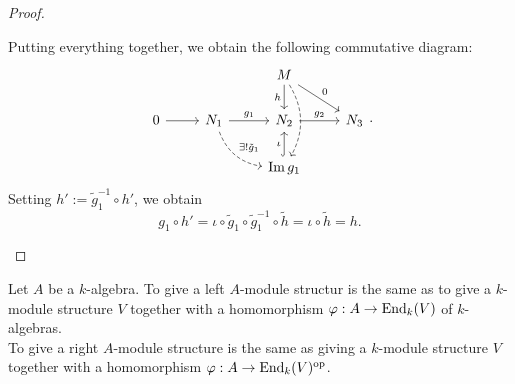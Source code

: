 \begin{proof}
\begin{itemize}
      Putting everything together, we obtain the following commutative diagram:
      \[
      \begin{tikzcd}
        &&M\ar[swap]{d}{h}\ar{rd}{0}\ar[bend left,dashed]{dd}&\\
        0\ar{r}&N_1\ar{r}{g_1}\ar[bend right,dashed]{dr}{\exists !\tilde{g}_1}&N_2\ar{r}{g_2}&N_3\\
        &&\im g_1\ar[hookrightarrow]{u}{\iota}&
      \end{tikzcd}.
      \]
      Setting $h':= \tilde{g}_1^{-1}\circ h'$, we obtain
      \[
      g_1\circ h' = \iota\circ \tilde{g}_1\circ \tilde{g}_1^{-1}\circ \tilde{h}= \iota \circ \tilde{h}= h.
      \]
    \end{itemize}
    \end{proof}
  \begin{prop}\label{2:endalg}
    Let $A$ be a $k$-algebra. To give a left $A$-module structur is the same as to give a $k$-module structure $V$ together with a homomorphism $\varphi:A\to \operatorname{End}_k(V)$ of $k$-algebras.\\
    To give a right $A$-module structure is the same as giving a $k$-module structure $V$ together with a homomorphism $\varphi:A\to \operatorname{End}_k(V)^{\mathrm{op}}$.
  \end{prop}


